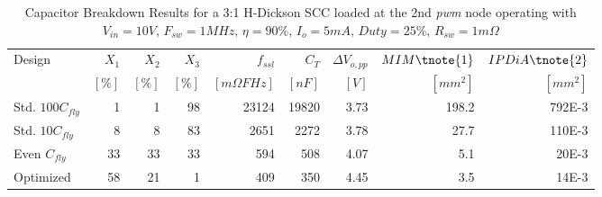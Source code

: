 \begin{table}[!h]
    \renewcommand{\arraystretch}{1.3}
    \begin{threeparttable}
    \centering
    \caption{Capacitor Breakdown Results for a 3:1 H-Dickson SCC loaded at the 2nd \emph{pwm} node operating with
             $V_{in} = 10V, \,  F_{sw} = 1MHz, \, \eta=90\%, \, I_o =5mA , \, Duty = 25\% , \, R_{sw}=1m \Omega$  }
    \label{tab:hscc_results}
    \begin{tabular}{ l | r | r | r || r | r | r || r | r }
      Design              & $X_1$   & $X_2$ & $X_3$   &  $f_{ssl}$          & $C_T$    & $\Delta V_{o,pp}$ & $ MIM\tnote{1} $  & $IPDiA \tnote{2}$ \\
                          &  $[\%]$ & $[\%]$ & $[\%]$ &  $[m\Omega F Hz]$  & $[nF]$    &     $[V]$  & $[mm^2]$   & $[mm^2]$           \\
                          \hline \hline
      Std. $100 C_{fly}$  &  1   &   1  &  98   &   23124     &  19820    &   3.73  & 198.2 &   792E-3   \\   \hline
      Std. $10 C_{fly}$   &  8   &   8  &  83   &    2651     &   2272    &   3.78  & 27.7  &   110E-3   \\    \hline
      Even $C_{fly}$      &  33  &  33  &  33   &     594     &    508    &   4.07  &  5.1  &   20E-3  \\      \hline
      Optimized           &  58  &  21  &  1    &     409     &    350    &   4.45  &  3.5  &   14E-3  \\

    \end{tabular}
    \end{threeparttable}
\end{table}

